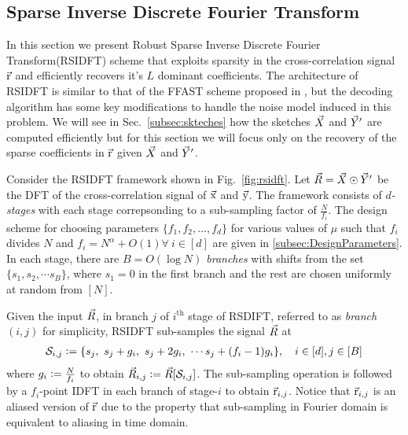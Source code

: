 \subsection{Sparse Inverse Discrete Fourier Transform}
\label{subsec:RSIDFT}	
 In this section we present Robust Sparse Inverse Discrete Fourier Transform(RSIDFT) scheme that exploits sparsity in the cross-correlation signal $\vec{\mathrm{r}}$ and efficiently recovers it's $L$ dominant coefficients. The architecture of RSIDFT is similar to that of the FFAST scheme proposed in \cite{pawar2014robust}, but the decoding algorithm has some key modifications to handle the noise model induced in this problem. We will see in Sec.~\ref{subsec:skteches} how the sketches $\vec{X}$ and $\vec{Y}'$ are computed efficiently but for this section we will focus only on the recovery of the sparse coefficients in $\vec{\mathrm{r}}$ given $\vec{X}$ and $\vec{Y}'$.
	  	
Consider the RSIDFT framework shown in Fig.~\ref{fig:rsidft}. Let $ \vec{R} =\vec{X} \odot \vec{Y}'$ be the DFT of the cross-correlation signal of $\vec{\mathrm{x}}$ and $\vec{\mathrm{y}}$. The framework consists of {\it $d$-stages} with each stage correpsonding to a sub-sampling factor of $\frac{N}{f_i}$. The design scheme for choosing parameters $\{f_1,f_2,\ldots,f_d\}$ for various values of $\mu$ such that $f_i$ divides $N$ and $f_i=N^{\alpha}+O(1) \forall ~i\in[d]$ are given in \ref{subsec:DesignParameters}. In each stage, there are {\it $B= O(\log N)$ branches} with shifts from the set $ \{s_1, s_2, \cdots s_B\} $, where $s_1 =0$ in the first branch and the rest are chosen uniformly at random from $[N]$.
	   	 	
	 Given the input $\vec{R}$, in branch $j$ of $i^{\text{th}}$ stage of RSDIFT, referred to as \textit{branch $(i,j)$} for simplicity, RSIDFT sub-samples the signal $\vec{R}$ at
\begin{align}
\label{Eqn:SamplingSets}
	 \mathcal{S}_{i,j} \mathrel{\mathop:}= \{s_j,\ s_j + g_i,\ s_j + 2g_i,\ \cdots s_j + (f_i-1) g_i\}, \quad i\in[d], j\in[B]
\end{align}
where $g_i\mathrel{\mathop:}= \frac{N}{f_i}$ to obtain $\vec{R}_{i,j}\mathrel{\mathop:}=\vec{R}[\mathcal{S}_{i,j}]$. The sub-sampling operation is followed by a $f_i$-point IDFT in each branch of stage-$i$ to obtain $ \vec{\mathrm{r}}_{i,j}$. Notice that $ \vec{\mathrm{r}}_{i,j}$ is an aliased version of $\vec{\mathrm{r}}$ due to the property that sub-sampling in Fourier domain is equivalent to aliasing in time domain.

